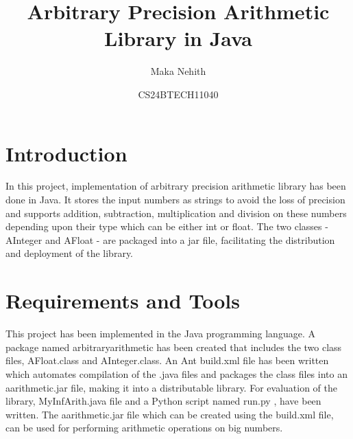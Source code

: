\documentclass[a4paper,12pt]{article}
\author{Maka Nehith}
\date{\small{CS24BTECH11040}}
\title{Arbitrary Precision Arithmetic Library in Java}
\begin{document}
\maketitle
{}

\section{Introduction}
In this project, implementation of arbitrary precision arithmetic library has been done in Java. It stores the input numbers as strings to avoid the loss of precision and supports addition, subtraction, multiplication and division on these numbers depending upon their type which can be either int or float. The two classes - AInteger and AFloat - are packaged into a jar file, facilitating the distribution and deployment of the library.


\section{Requirements and Tools}
This project has been implemented in the Java programming language. A package named arbitraryarithmetic has been created that includes the two class files, AFloat.class and AInteger.class. An Ant build.xml file has been written which automates compilation of the .java files and packages the class files into an aarithmetic.jar file, making it into a distributable library. For evaluation of the library, MyInfArith.java file and a Python script named run.py , have been written. The aarithmetic.jar file which can be created using the build.xml file, can be used for performing arithmetic operations on big numbers.
\end{document}
